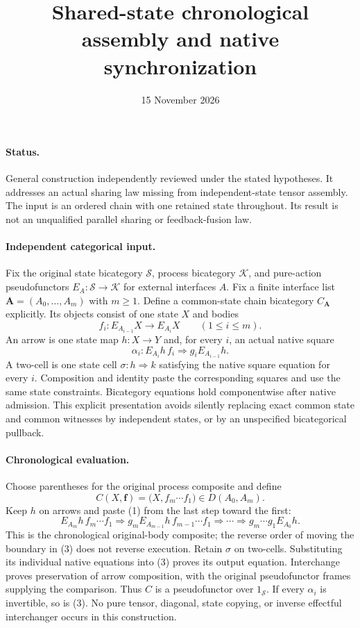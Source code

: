 \documentclass{article}
\title{Shared-state chronological assembly and native synchronization}
\date{15 November 2026}
\begin{document}
\maketitle
\paragraph{Status.} General construction independently reviewed under the stated hypotheses. It addresses an actual sharing law missing from independent-state tensor assembly. The input is an ordered chain with one retained state throughout. Its result is not an unqualified parallel sharing or feedback-fusion law.

\paragraph{Independent categorical input.} Fix the original state bicategory $\mathcal S$, process bicategory $\mathcal K$, and pure-action pseudofunctors $E_A:\mathcal S\to\mathcal K$ for external interfaces $A$. Fix a finite interface list $\mathbf A=(A_0,\ldots,A_m)$ with $m\geq1$. Define a common-state chain bicategory $C_{\mathbf A}$ explicitly. Its objects consist of one state $X$ and bodies
\[
 f_i:E_{A_{i-1}}X\longrightarrow E_{A_i}X\qquad(1\leq i\leq m).
\]
An arrow is one state map $h:X\to Y$ and, for every $i$, an actual native square
\[
 \alpha_i:E_{A_i}h\, f_i\Rightarrow g_i E_{A_{i-1}}h.
\tag{1}
\]
A two-cell is one state cell $\sigma:h\Rightarrow k$ satisfying the native square equation for every $i$. Composition and identity paste the corresponding squares and use the same state constraints. Bicategory equations hold componentwise after native admission. This explicit presentation avoids silently replacing exact common state and common witnesses by independent states, or by an unspecified bicategorical pullback.

\paragraph{Chronological evaluation.} Choose parentheses for the original process composite and define
\[
 C(X,\mathbf f)=\bigl(X,f_m\cdots f_1\bigr)
 \in D(A_0,A_m).
\tag{2}
\]
Keep $h$ on arrows and paste (1) from the last step toward the first:
\[
 E_{A_m}h\,f_m\cdots f_1
 \Rightarrow g_m E_{A_{m-1}}h\,f_{m-1}\cdots f_1
 \Rightarrow\cdots\Rightarrow
 g_m\cdots g_1 E_{A_0}h.
\tag{3}
\]
This is the chronological original-body composite; the reverse order of moving the boundary in (3) does not reverse execution. Retain $\sigma$ on two-cells. Substituting its individual native equations into (3) proves its output equation. Interchange proves preservation of arrow composition, with the original pseudofunctor frames supplying the comparison. Thus $C$ is a pseudofunctor over $1_{\mathcal S}$. If every $\alpha_i$ is invertible, so is (3). No pure tensor, diagonal, state copying, or inverse effectful interchanger occurs in this construction.
\end{document}
